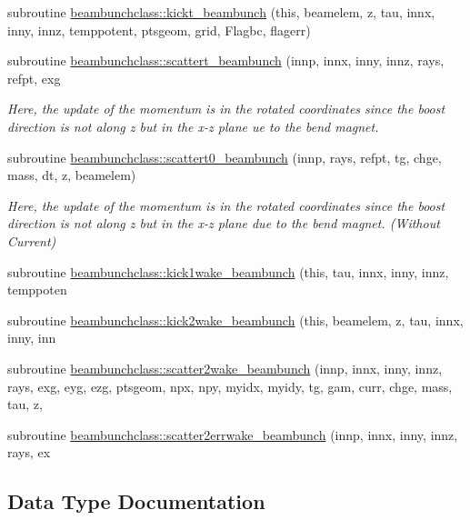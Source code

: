 \begin{DoxyCompactItemize}
subroutine \mbox{\hyperlink{namespacebeambunchclass_a119b1d68c4a2a790014a9408c2db1575}{beambunchclass\+::kickt\+\_\+beambunch}} (this, beamelem, z, tau, innx, inny, innz, temppotent, ptsgeom, grid, Flagbc, flagerr)
\item 
subroutine \mbox{\hyperlink{namespacebeambunchclass_a3da6bfdf683e278c6005fddbceac16db}{beambunchclass\+::scattert\+\_\+beambunch}} (innp, innx, inny, innz, rays, refpt, exg
\begin{DoxyCompactList}\small\item\em Here, the update of the momentum is in the rotated coordinates since the boost direction is not along z but in the x-\/z plane ue to the bend magnet. \end{DoxyCompactList}\item 
subroutine \mbox{\hyperlink{namespacebeambunchclass_a80dd0ce0010992cda1f2ba4d873371e0}{beambunchclass\+::scattert0\+\_\+beambunch}} (innp, rays, refpt, tg, chge, mass, dt, z, beamelem)
\begin{DoxyCompactList}\small\item\em Here, the update of the momentum is in the rotated coordinates since the boost direction is not along z but in the x-\/z plane due to the bend magnet. (Without Current) \end{DoxyCompactList}\item 
subroutine \mbox{\hyperlink{namespacebeambunchclass_a02f7f46438747a0fb811de64b1ed95aa}{beambunchclass\+::kick1wake\+\_\+beambunch}} (this, tau, innx, inny, innz, temppoten
\item 
subroutine \mbox{\hyperlink{namespacebeambunchclass_a530cca8371b8decda64389ce29d10bcd}{beambunchclass\+::kick2wake\+\_\+beambunch}} (this, beamelem, z, tau, innx, inny, inn
\item 
subroutine \mbox{\hyperlink{namespacebeambunchclass_aa17d706a08d23a054bf547514e796e6a}{beambunchclass\+::scatter2wake\+\_\+beambunch}} (innp, innx, inny, innz, rays, exg, eyg, ezg, ptsgeom, npx, npy, myidx, myidy, tg, gam, curr, chge, mass, tau, z,
\item 
subroutine \mbox{\hyperlink{namespacebeambunchclass_a2395bc91f4fc52175d8a5cc92890bb83}{beambunchclass\+::scatter2errwake\+\_\+beambunch}} (innp, innx, inny, innz, rays, ex
\end{DoxyCompactItemize}


\subsection{Data Type Documentation}
\label{structbeambunchclass_1_1beambunch}

